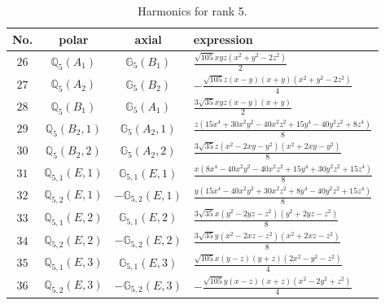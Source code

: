 \documentclass[fleqn,8pt,landscape]{jsarticle}
\begin{document}
\begin{table}[ht!]
\begin{center}
\caption{Harmonics for rank 5.}
\renewcommand{\arraystretch}{1.3}
\begin{tabular}{cccl} \hline \hline
No. & polar & axial & expression \\ \hline
$ 26 $ & $ \mathbb{Q}_{5}(A_{1}) $ & $ \mathbb{G}_{5}(B_{1}) $ & $ \frac{\sqrt{105} x y z \left(x^{2} + y^{2} - 2 z^{2}\right)}{2} $ \\
$ 27 $ & $ \mathbb{Q}_{5}(A_{2}) $ & $ \mathbb{G}_{5}(B_{2}) $ & $ - \frac{\sqrt{105} z \left(x - y\right) \left(x + y\right) \left(x^{2} + y^{2} - 2 z^{2}\right)}{4} $ \\
$ 28 $ & $ \mathbb{Q}_{5}(B_{1}) $ & $ \mathbb{G}_{5}(A_{1}) $ & $ \frac{3 \sqrt{35} x y z \left(x - y\right) \left(x + y\right)}{2} $ \\
$ 29 $ & $ \mathbb{Q}_{5}(B_{2},1) $ & $ \mathbb{G}_{5}(A_{2},1) $ & $ \frac{z \left(15 x^{4} + 30 x^{2} y^{2} - 40 x^{2} z^{2} + 15 y^{4} - 40 y^{2} z^{2} + 8 z^{4}\right)}{8} $ \\
$ 30 $ & $ \mathbb{Q}_{5}(B_{2},2) $ & $ \mathbb{G}_{5}(A_{2},2) $ & $ \frac{3 \sqrt{35} z \left(x^{2} - 2 x y - y^{2}\right) \left(x^{2} + 2 x y - y^{2}\right)}{8} $ \\
$ 31 $ & $ \mathbb{Q}_{5,1}(E,1) $ & $ \mathbb{G}_{5,1}(E,1) $ & $ \frac{x \left(8 x^{4} - 40 x^{2} y^{2} - 40 x^{2} z^{2} + 15 y^{4} + 30 y^{2} z^{2} + 15 z^{4}\right)}{8} $ \\
$ 32 $ & $ \mathbb{Q}_{5,2}(E,1) $ & $ -\mathbb{G}_{5,2}(E,1) $ & $ \frac{y \left(15 x^{4} - 40 x^{2} y^{2} + 30 x^{2} z^{2} + 8 y^{4} - 40 y^{2} z^{2} + 15 z^{4}\right)}{8} $ \\
$ 33 $ & $ \mathbb{Q}_{5,1}(E,2) $ & $ \mathbb{G}_{5,1}(E,2) $ & $ \frac{3 \sqrt{35} x \left(y^{2} - 2 y z - z^{2}\right) \left(y^{2} + 2 y z - z^{2}\right)}{8} $ \\
$ 34 $ & $ \mathbb{Q}_{5,2}(E,2) $ & $ -\mathbb{G}_{5,2}(E,2) $ & $ \frac{3 \sqrt{35} y \left(x^{2} - 2 x z - z^{2}\right) \left(x^{2} + 2 x z - z^{2}\right)}{8} $ \\
$ 35 $ & $ \mathbb{Q}_{5,1}(E,3) $ & $ \mathbb{G}_{5,1}(E,3) $ & $ \frac{\sqrt{105} x \left(y - z\right) \left(y + z\right) \left(2 x^{2} - y^{2} - z^{2}\right)}{4} $ \\
$ 36 $ & $ \mathbb{Q}_{5,2}(E,3) $ & $ -\mathbb{G}_{5,2}(E,3) $ & $ - \frac{\sqrt{105} y \left(x - z\right) \left(x + z\right) \left(x^{2} - 2 y^{2} + z^{2}\right)}{4} $ \\
 \hline \hline
\end{tabular}
\end{center}
\end{table}
\end{document}
